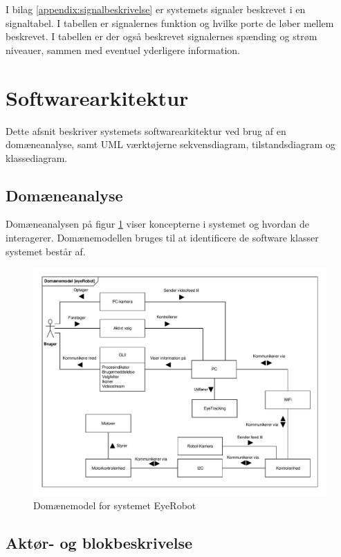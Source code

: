 I bilag \ref{appendix:signalbeskrivelse} er systemets signaler beskrevet i en signaltabel. I tabellen er signalernes funktion og hvilke porte de løber mellem beskrevet. I tabellen er der også beskrevet signalernes spænding og strøm niveauer, sammen med eventuel yderligere information.  



\newpage
\section{Softwarearkitektur}
Dette afsnit beskriver systemets softwarearkitektur ved brug af en domæneanalyse, samt UML værktøjerne sekvensdiagram, tilstandsdiagram og klassediagram. 

\subsection{Domæneanalyse}
Domæneanalysen på figur \ref{fig:Domainmodel} viser koncepterne i systemet og hvordan de interagerer. Domænemodellen bruges til at identificere de software klasser systemet består af. 

\begin{figure}[H]
	\centering
	\includegraphics[width = \textwidth]{figur/Domainmodel.pdf}
	\caption{Domænemodel for systemet EyeRobot}
	\label{fig:Domainmodel}
\end{figure}

\newpage

\subsection{Aktør- og blokbeskrivelse}

